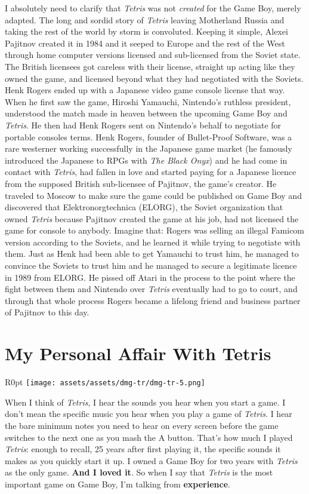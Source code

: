 \documentclass{book}
\begin{document}
I absolutely need to clarify that \emph{Tetris} was not \emph{created} for the Game Boy, merely adapted. The long and sordid story of \emph{Tetris} leaving Motherland Russia and taking the rest of the world by storm is convoluted. Keeping it simple, Alexei Pajitnov created it in 1984 and it seeped to Europe and the rest of the West through home computer versions licensed and sub-licensed from the Soviet state. The British licensees got careless with their license, straight up acting like they owned the game, and licensed beyond what they had negotiated with the Soviets. Henk Rogers ended up with a Japanese video game console license that way. When he first saw the game, Hiroshi Yamauchi, Nintendo’s ruthless president, understood the match made in heaven between the upcoming Game Boy and \emph{Tetris}. He then had Henk Rogers sent on Nintendo’s behalf to negotiate for portable consoles terms. Henk Rogers, founder of Bullet-Proof Software, was a rare westerner working successfully in the Japanese game market (he famously introduced the Japanese to RPGs with \emph{The Black Onyx}) and he had come in contact with \emph{Tetris}, had fallen in love and started paying for a Japanese licence from the supposed British sub-licensee of Pajitnov, the game’s creator. He traveled to Moscow to make sure the game could be published on Game Boy and discovered that Elektronorgtechnica (ELORG), the Soviet organization that owned \emph{Tetris} because Pajitnov created the game at his job, had not licensed the game for console to anybody. Imagine that: Rogers was selling an illegal Famicom version according to the Soviets, and he learned it while trying to negotiate with them. Just as Henk had been able to get Yamauchi to trust him, he managed to convince the Soviets to trust him and he managed to secure a legitimate licence in 1989 from ELORG. He pissed off Atari in the process to the point where the fight between them and Nintendo over \emph{Tetris} eventually had to go to court, and through that whole process Rogers became a lifelong friend and business partner of Pajitnov to this day.

\FloatBarrier\needspace{10mm}\section*{My Personal Affair With Tetris}\nopagebreak[4]

\begin{wrapfigure}{R}{0pt} \texttt{[image: assets/assets/dmg-tr/dmg-tr-5.png]}\end{wrapfigure}
When I think of \emph{Tetris}, I hear the sounds you hear when you start a game. I don’t mean the specific music you hear when you play a game of \emph{Tetris}. I hear the bare minimum notes you need to hear on every screen before the game switches to the next one as you mash the A button. That’s how much I played \emph{Tetris}: enough to recall, 25 years after first playing it, the specific sounds it makes as you quickly start it up. I owned a Game Boy for two years with \emph{Tetris} as the only game. \textbf{And I loved it}. So when I say that \emph{Tetris} is the most important game on Game Boy, I’m talking from \textbf{experience}.
\end{document}
